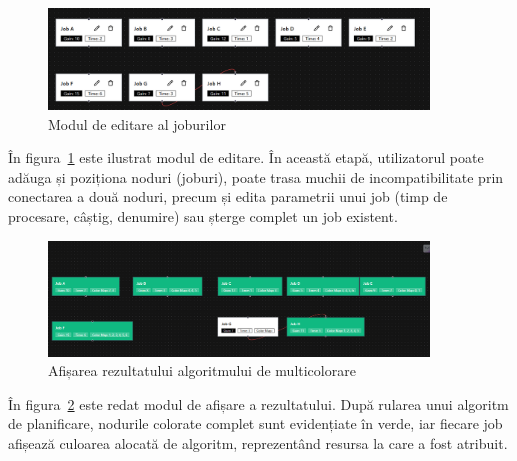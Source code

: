 \begin{figure}[h]
\centering
\includegraphics[width=0.9\textwidth]{images/noduri.png}
\caption{Modul de editare al joburilor}\label{fig:noduri}
\end{figure}

În figura~\ref{fig:noduri} este ilustrat modul de editare. În această etapă, utilizatorul poate adăuga și poziționa noduri (joburi), poate trasa muchii de incompatibilitate prin conectarea a două noduri, precum și edita parametrii unui job (timp de procesare, câștig, denumire) sau șterge complet un job existent.

\begin{figure}[h]
\centering
\includegraphics[width=0.9\textwidth]{images/noduri_rezultat.png}
\caption{Afișarea rezultatului algoritmului de multicolorare}\label{fig:noduri_rezultat}
\end{figure}

În figura~\ref{fig:noduri_rezultat} este redat modul de afișare a rezultatului. După rularea unui algoritm de planificare, nodurile colorate complet sunt evidențiate în verde, iar fiecare job afișează culoarea alocată de algoritm, reprezentând resursa la care a fost atribuit.

